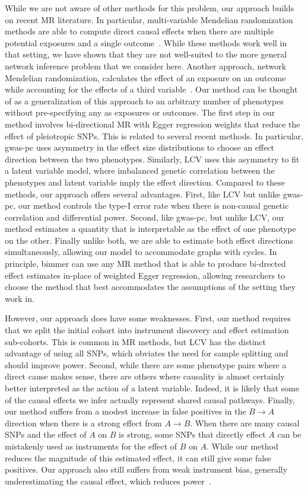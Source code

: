 \documentclass{article}
\begin{document}
While we are not aware of other methods for this problem, our approach
builds on recent MR literature. In particular, multi-variable Mendelian
randomization methods are able to compute direct causal effects when there
are multiple potential exposures and a single outcome~\cite{Zuber2020,Burgess2015a}. While
these methods work well in that setting, we have shown that they are not well-suited
to the more general network inference problem that we consider here. Another approach, network
Mendelian randomization, calculates the effect of an exposure on an outcome while
accounting for the effects of a third variable~\cite{Burgess2015}. Our method can
be thought of as a generalization of this approach to an arbitrary number of phenotypes
without pre-specifying any as exposures or outcomes. The first step in our method
involves bi-directional MR with Egger regression weights that reduce the effect
of pleiotropic SNPs. This is related to several recent methods.
In particular, gwas-pc uses asymmetry in the effect size distributions
to choose an effect direction between the two phenotypes. Similarly, 
LCV uses this asymmetry to fit a latent variable model, where imbalanced
genetic correlation between the phenotypes and latent variable imply
the effect direction. Compared to these methods, our approach offers several
advantages. First, like LCV but unlike gwas-pc, our method controls the type-I error rate
when there is non-causal genetic correlation and differential power. Second, like gwas-pc,
but unlike LCV, our method estimates a quantity that is interpretable as the
effect of one phenotype on the other. Finally unlike both,
we are able to estimate both effect directions simultaneously, allowing our
model to accommodate graphs with cycles. In principle, bimmer can use any MR method
that is able to produce bi-drected effect estimates in-place of weighted Egger
regression, allowing researchers to choose the method that best accommodates the assumptions of
the setting they work in.

However, our approach does have some weaknesses. First, our method
requires that we split the initial cohort into instrument discovery and
effect estimation sub-cohorts. This is common in MR methods, but LCV has
the distinct advantage of using all SNPs, which obviates the need
for sample splitting and should improve power. Second, while there are some
phenotype pairs where a direct cause makes sense, there are others where causality is 
almost certainly better interpreted as the action of a latent variable. Indeed, it is likely
that some of the causal effects we infer actually represent shared causal pathways.
Finally, our method suffers from a modest increase in false positives in the $B\rightarrow A$
direction when there is a strong effect from $A\rightarrow B$. When there are many
causal SNPs and the effect of $A$ on $B$ is strong, some SNPs that directly effect $A$
can be mistakenly used as instruments for the effect of $B$ on $A$. While our method
reduces the magnitude of this estimated effect, it can still give some false positives.
Our approach also still suffers from weak instrument bias, generally underestimating
the causal effect, which reduces power~\cite{Davies2015}.
\end{document}
